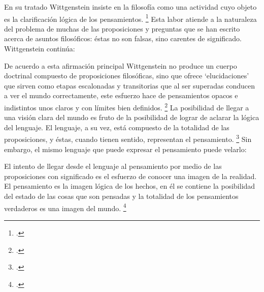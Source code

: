 En su tratado Wittgenstein insiste en
la filosofía como una actividad cuyo objeto es la clarificación lógica de los
pensamientos. \footcite[4.112 p. 52]{tractatus} Esta labor atiende a la
naturaleza del problema de muchas de las proposiciones y preguntas que se han
escrito acerca de asuntos filosóficos: éstas no son falsas, sino carentes de
significado. Wittgenstein continúa: 



De acuerdo a esta afirmación principal Wittgenstein no produce un cuerpo
doctrinal compuesto de proposiciones filosóficas, sino que ofrece
`elucidaciones' que sirven como etapas escalonadas y transitorias que al ser
superadas conducen a ver el mundo correctamente, este esfuerzo hace de
pensamientos opacos e indistintos unos claros y con límites bien definidos.
\footcite[cf. 4.112 y 6.54]{tractatus} La posibilidad de llegar a una visión
clara del mundo es fruto de la posibilidad de lograr de aclarar la lógica del
lenguaje. El lenguaje, a su vez, está compuesto de la totalidad de las
proposiciones, y éstas, cuando tienen sentido, representan el pensamiento.
\footcite[cf. 4 y 4.001]{tractatus} Sin embargo, el mismo lenguaje que puede
expresar el pensamiento puede velarlo:


El intento de llegar desde el lenguaje al pensamiento por medio de las
proposiciones con significado es el esfuerzo de conocer una imagen de la
realidad. El pensamiento es la imagen lógica de los hechos, en él se contiene la
posibilidad del estado de las cosas que son pensadas y la totalidad de los
pensamientos verdaderos es una imagen del mundo. \footcite[cf. 3 y
3.001]{tractatus}


